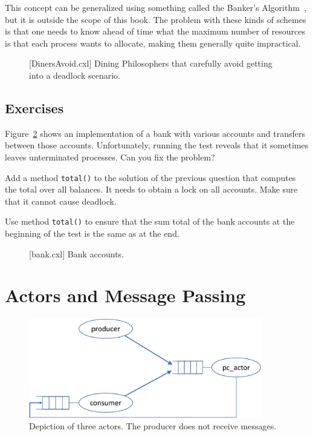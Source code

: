 \documentclass{report}
\newenvironment{code}{
\tcolorbox
}{
\endtcolorbox
}
\begin{document}
This concept can be generalized using something called the
Banker's Algorithm~\cite{EWD108}, but it is outside the scope of this book.
The problem with these kinds of schemes is that one needs to know ahead of time
what the maximum number of resources is that each process wants to allocate,
making them generally quite impractical.

\begin{figure}
\begin{code}
\end{code}
\caption{[DinersAvoid.cxl] Dining Philosophers that carefully avoid getting into a deadlock
scenario.}
\label{fig:dinersavoid}
\end{figure}

\section*{Exercises}
\begin{problems}
\item Figure~\ref{fig:bank} shows an implementation of a bank with various
accounts and transfers between those accounts.
Unfortunately, running the test reveals that it sometimes leaves unterminated
processes.  Can you fix the problem?
\item Add a method \texttt{total()} to the solution of the previous question
that computes the total over all balances.
It needs to obtain a lock on all accounts.  Make sure that
it cannot cause deadlock.
\item Use method \texttt{total()} to ensure that the sum total of the bank
accounts at the beginning of the test is the same as at the end.
\end{problems}

\begin{figure}
\begin{code}
\end{code}
\caption{[bank.cxl] Bank accounts.}
\label{fig:bank}
\end{figure}

\chapter{Actors and Message Passing}
\label{ch:actor}

\begin{figure}
\begin{center}
\includegraphics[width=4in]{figures/actor-crop.pdf}
\end{center}
\caption{Depiction of three actors.  The producer does not receive messages.}
\label{fig:actorpic}
\end{figure}
\end{document}
